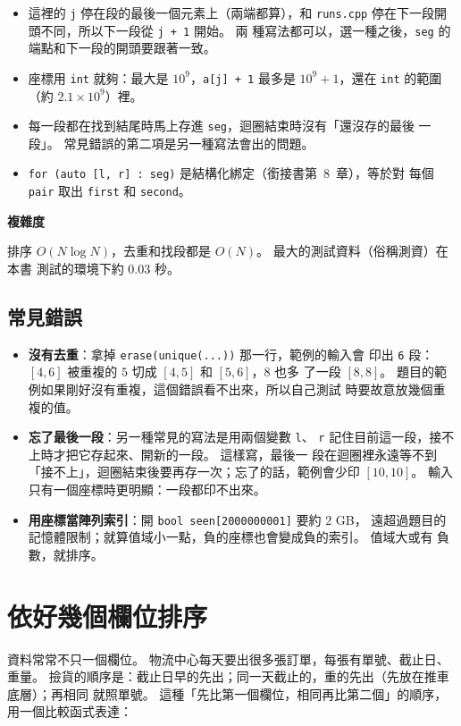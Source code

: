 \begin{itemize}
\item 這裡的 \texttt{j} 停在段的最後一個元素上（兩端都算），和
\texttt{runs.cpp} 停在下一段開頭不同，所以下一段從 \texttt{j + 1} 開始。 兩
種寫法都可以，選一種之後，\texttt{seg} 的端點和下一段的開頭要跟著一致。
\item 座標用 \texttt{int} 就夠：最大是 $10^9$，\texttt{a[j] + 1} 最多是
$10^9 + 1$，還在 \texttt{int} 的範圍（約 $2.1 \times 10^9$）裡。
\item 每一段都在找到結尾時馬上存進 \texttt{seg}，迴圈結束時沒有「還沒存的最後
一段」。 常見錯誤的第二項是另一種寫法會出的問題。
\item \texttt{for (auto [l, r] : seg)} 是結構化綁定（銜接書第~8~章），等於對
每個 \texttt{pair} 取出 \texttt{first} 和 \texttt{second}。
\end{itemize}

\textbf{複雜度}

排序 $O(N \log N)$，去重和找段都是 $O(N)$。 最大的測試資料（俗稱測資）在本書
測試的環境下約 $0.03$ 秒。

\subsection{常見錯誤}

\begin{itemize}
\item \textbf{沒有去重}：拿掉 \texttt{erase(unique(...))} 那一行，範例的輸入會
印出 \texttt{6} 段：$[4, 6]$ 被重複的 $5$ 切成 $[4, 5]$ 和 $[5, 6]$，$8$ 也多
了一段 $[8, 8]$。 題目的範例如果剛好沒有重複，這個錯誤看不出來，所以自己測試
時要故意放幾個重複的值。
\item \textbf{忘了最後一段}：另一種常見的寫法是用兩個變數 \texttt{l}、
\texttt{r} 記住目前這一段，接不上時才把它存起來、開新的一段。 這樣寫，最後一
段在迴圈裡永遠等不到「接不上」，迴圈結束後要再存一次；忘了的話，範例會少印
$[10, 10]$。 輸入只有一個座標時更明顯：一段都印不出來。
\item \textbf{用座標當陣列索引}：開 \texttt{bool seen[2000000001]} 要約 $2$ GB，
遠超過題目的記憶體限制；就算值域小一點，負的座標也會變成負的索引。 值域大或有
負數，就排序。
\end{itemize}

\section{依好幾個欄位排序}
\label{sec:srt-multikey}

資料常常不只一個欄位。 物流中心每天要出很多張訂單，每張有單號、截止日、重量。
撿貨的順序是：截止日早的先出；同一天截止的，重的先出（先放在推車底層）；再相同
就照單號。 這種「先比第一個欄位，相同再比第二個」的順序，用一個比較函式表達：

